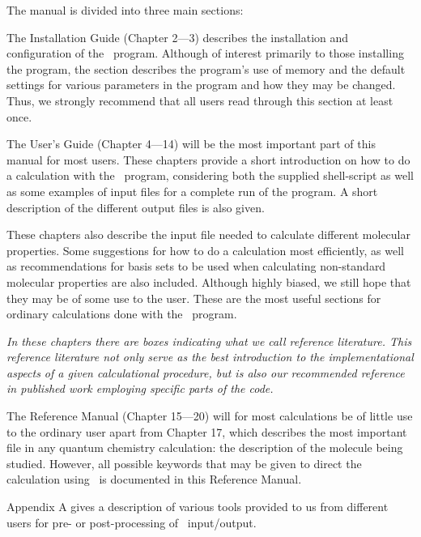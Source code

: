 The manual is divided into three main sections:

\begin{description}
\item The Installation Guide (Chapter 2---3) describes the
installation and configuration of the \siraba\ program. Although of
interest primarily to those installing the program, the section
describes the program's use of memory and the default settings for
various parameters in the program and how they may be changed. Thus,
we strongly recommend that all users read through this section at least
once.

\item The User's Guide (Chapter 4---14) will be the most important part
of this manual for most users. These chapters provide a  short
introduction on how to do a calculation with the \siraba\ program,
considering both the supplied shell-script as well as some examples of
input files for a complete run of the program. A short description of
the different output files is also given.

These chapters also describe the input file needed to
calculate different molecular properties. Some
suggestions for how to do a calculation most efficiently, as well as
recommendations for basis sets to be used when calculating non-standard
molecular properties are also included. Although highly biased, we
still hope that they may be of some
use to the user. These are the most useful sections for
ordinary calculations done with the \siraba\ program.

{\em In these chapters there are boxes indicating what we call {\em
reference literature}. This reference
literature not only serve as
the best introduction to the implementational aspects of a given
calculational procedure, but is also our recommended reference in published
work employing specific parts of the code.}

\item The Reference Manual (Chapter 15---20) will for most calculations be of
little use to the ordinary user apart from Chapter 17, which describes
the most important file in any quantum chemistry calculation: the
description of the molecule being studied. However, all possible
keywords that may be given to direct the calculation using \siraba\ is
documented in this Reference Manual.

\item Appendix A gives a description of various tools provided to us
from different users for pre- or post-processing of \siraba\
input/output.
\end{description}

